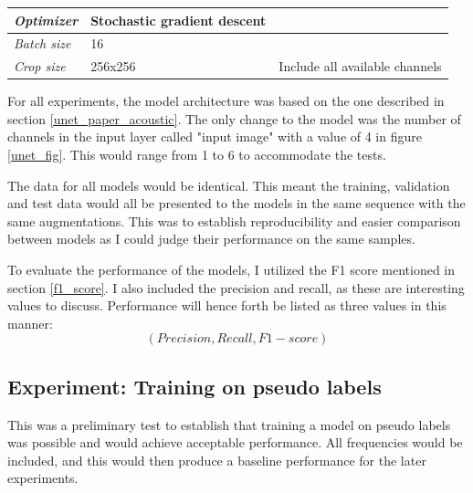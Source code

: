 \begin{table}[H]
\begin{tabular}{lll}
        \multicolumn{1}{|l|}{\textit{Optimizer}}                & \multicolumn{1}{l|}{Stochastic gradient descent}           & \multicolumn{1}{l|}{}                                                                                   \\ \hline
        \multicolumn{1}{|l|}{\textit{Batch size}}               & \multicolumn{1}{l|}{16}                                    & \multicolumn{1}{l|}{}                                                                                   \\ \hline
        \multicolumn{1}{|l|}{\textit{Crop size}}                & \multicolumn{1}{l|}{256x256}                               & \multicolumn{1}{l|}{Include all available channels}                                                     \\ \hline
        \end{tabular}
        \end{table}
        
        For all experiments, the model architecture was based on the one described in section \ref{unet_paper_acoustic}. The only change to the model was the number of channels in the input layer called "input image" with a value of 4 in figure \ref{unet_fig}. This would range from 1 to 6 to accommodate the tests.
        
        The data for all models would be identical. This meant the training, validation and test data would all be presented to the models in the same sequence with the same augmentations. This was to establish reproducibility and easier comparison between models as I could judge their performance on the same samples.
        
        To evaluate the performance of the models, I utilized the F1 score mentioned in section \ref{f1_score}. I also included the precision and recall, as these are interesting values to discuss. Performance will hence forth be listed as three values in this manner:
            \begin{equation} \label{performance_metric}
                (Precision, Recall, F1-score)
            \end{equation}
        
    \subsection{Experiment: Training on pseudo labels}
      This was a preliminary test to establish that training a model on pseudo labels was possible and would achieve acceptable performance. All frequencies would be included, and this would then produce a baseline performance for the later experiments. 
    
